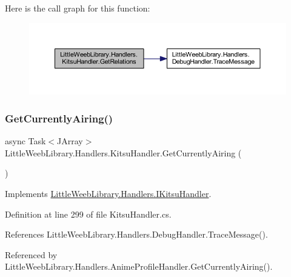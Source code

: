 Here is the call graph for this function\+:\nopagebreak
\begin{figure}[H]
\begin{center}
\leavevmode
\includegraphics[width=350pt]{class_little_weeb_library_1_1_handlers_1_1_kitsu_handler_ad1ba51037e72c80804018f4c1df37581_cgraph}
\end{center}
\end{figure}
\mbox{\label{class_little_weeb_library_1_1_handlers_1_1_kitsu_handler_af733f442659b7789588da55b00c065c4}} 
\subsubsection{\texorpdfstring{Get\+Currently\+Airing()}{GetCurrentlyAiring()}}
{\footnotesize\ttfamily async Task$<$J\+Array$>$ Little\+Weeb\+Library.\+Handlers.\+Kitsu\+Handler.\+Get\+Currently\+Airing (\begin{DoxyParamCaption}{ }\end{DoxyParamCaption})}



Implements \mbox{\hyperlink{interface_little_weeb_library_1_1_handlers_1_1_i_kitsu_handler_a644c9e4caf1db5de18a78fe03b33e278}{Little\+Weeb\+Library.\+Handlers.\+I\+Kitsu\+Handler}}.



Definition at line 299 of file Kitsu\+Handler.\+cs.



References Little\+Weeb\+Library.\+Handlers.\+Debug\+Handler.\+Trace\+Message().



Referenced by Little\+Weeb\+Library.\+Handlers.\+Anime\+Profile\+Handler.\+Get\+Currently\+Airing().



